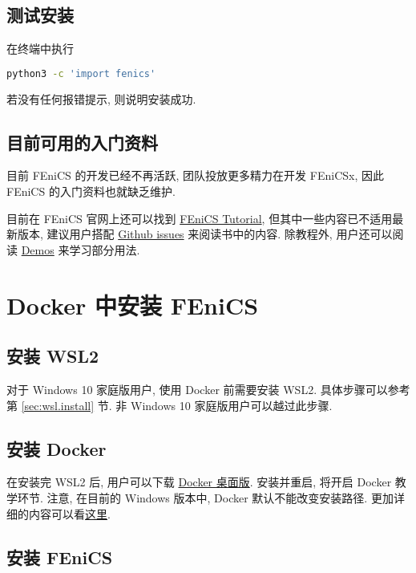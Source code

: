 \documentclass[fontset=founder]{ctexrep}
\begin{document}
\section{测试安装}

在终端中执行
\begin{lstlisting}[language = bash]
  python3 -c 'import fenics'
\end{lstlisting}
若没有任何报错提示,
则说明安装成功.

\section{目前可用的入门资料}

目前 FEniCS 的开发已经不再活跃,
团队投放更多精力在开发 FEniCSx,
因此 FEniCS 的入门资料也就缺乏维护.

目前在 FEniCS 官网上还可以找到
\href{https://fenicsproject.org/tutorial/}{FEniCS Tutorial},
但其中一些内容已不适用最新版本,
建议用户搭配 \href{https://github.com/hplgit/fenics-tutorial/issues}{Github issues}
来阅读书中的内容.
除教程外,
用户还可以阅读
\href{https://fenicsproject.org/olddocs/dolfin/latest/python/demos.html}{Demos}
来学习部分用法.

\chapter{Docker 中安装 FEniCS}

\section{安装 WSL2}\label{sec:install-wsl2}

对于 Windows 10 家庭版用户,
使用 Docker 前需要安装 WSL2.
具体步骤可以参考第 \ref{sec:wsl.install} 节.
非 Windows 10 家庭版用户可以越过此步骤.

\section{安装 Docker}\label{sec:install-docker}

在安装完 WSL2 后,
用户可以下载 \href{https://www.docker.com/get-started}{Docker 桌面版}.
安装并重启,
将开启 Docker 教学环节.
注意,
在目前的 Windows 版本中,
Docker 默认不能改变安装路径.
更加详细的内容可以看\href{https://docs.docker.com/desktop/windows/install/}{这里}.

\section{安装 FEniCS}
\end{document}
